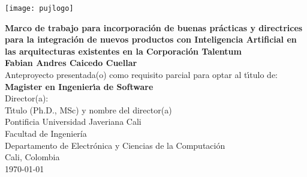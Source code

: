 \begin{center}
\thispagestyle{empty}
\vspace*{-2.2cm}
\begin{center}
    \texttt{[image: pujlogo]}~\\[1cm]
\end{center}
\textbf{\huge
Marco de trabajo para incorporación de buenas prácticas y directrices para la integración de nuevos productos con Inteligencia Artificial en las arquitecturas existentes en la Corporación Talentum}\\[1.2cm]
\Large\textbf{Fabian Andres Caicedo Cuellar}\\[1cm]
\small Anteproyecto presentada(o) como requisito parcial para optar al
t\'{\i}tulo de:\\
\textbf{Magister en Ingenier\'{\i}a de Software}\\[1cm]
Director(a):\\
T\'{\i}tulo (Ph.D., MSc) y nombre del director(a)\\[1cm]

Pontificia Universidad Javeriana Cali\\
Facultad de Ingeniería\\
Departamento de Electrónica y Ciencias de la Computación\\
Cali, Colombia\\
\today\\
\end{center}
